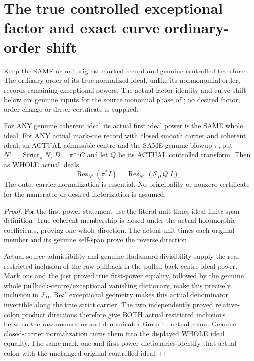 \section{The true controlled exceptional factor and exact curve ordinary-order shift}

Keep the SAME actual original marked record and genuine controlled transform.
The ordinary order of its true normalized ideal, unlike its nonmonomial
order, records remaining exceptional powers. The actual factor identity
and curve shift below are genuine inputs for the source monomial phase
of \cite[Lemma~12.8, p.~295]{bierstone-milman97-invent-math}; no desired
factor, order change or driver certificate is supplied.

\begin{theorem}
\label{hir:sharp-actual-controlled-markone-whole-exceptional-factor}
\leanok
For ANY genuine coherent ideal its actual first ideal power is the SAME
whole ideal. For ANY actual mark-one record with closed smooth carrier
and coherent ideal, an ACTUAL admissible centre and the SAME genuine
blowup $\pi$, put $N'=\operatorname{Strict}_\pi N$, $D=\pi^{-1}C$
and let $Q$ be its ACTUAL controlled transform. Then as WHOLE actual ideals,
\[
 \operatorname{Res}_{N'}(\pi^*I)
  =\operatorname{Res}_{N'}(\mathcal I_D\,Q.I).
\]
The outer carrier normalization is essential. No principality or
nonzero certificate for the numerator or desired factorization is assumed.
\end{theorem}
\begin{proof}
For the first-power statement use the literal unit-times-ideal finite-span
definition. True coherent membership is closed under the actual holomorphic
coefficients, proving one whole direction. The actual unit times each
original member and its genuine self-span prove the reverse direction.

Actual source admissibility and genuine Hadamard divisibility supply the
real restricted inclusion of the raw pullback in the pulled-back centre
ideal power. Mark one and the just proved true first-power equality,
followed by the genuine whole pullback-centre/exceptional vanishing
dictionary, make this precisely inclusion in $\mathcal I_D$. Real
exceptional geometry makes this actual denominator invertible along the
true strict carrier. The two independently proved relative-colon product
directions therefore give BOTH actual restricted inclusions between the
raw numerator and denominator times its actual colon. Genuine closed-carrier
normalization turns them into the displayed WHOLE ideal equality. The
same mark-one and first-power dictionaries identify that actual colon
with the unchanged original controlled ideal.
\end{proof}

